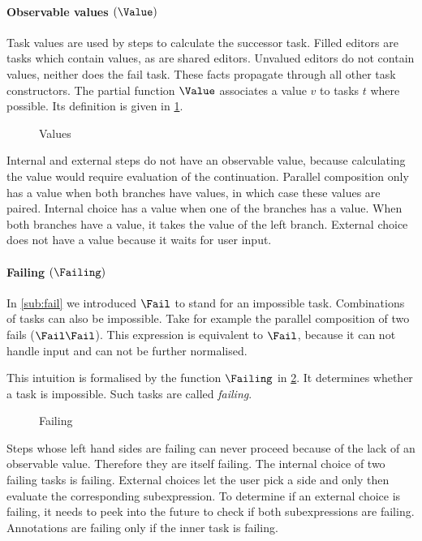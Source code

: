\paragraph{Observable values $(\Value)$}

Task values are used by steps to calculate the successor task.
Filled editors are tasks which contain values, as are shared editors.
Unvalued editors do not contain values, neither does the fail task.
These facts propagate through all other task constructors.
The partial function $\Value$ associates a value $v$ to tasks $t$ where possible.
Its definition is given in \cref{fig:observation-value}.

\begin{figure}[h]
  \small
  \caption{Values} \label{fig:observation-value}
\end{figure}

Internal and external steps do not have an observable value, because calculating the value would require evaluation of the continuation.
Parallel composition only has a value when both branches have values, in which case these values are paired.
Internal choice has a value when one of the branches has a value.
When both branches have a value, it takes the value of the left branch.
External choice does not have a value because it waits for user input.



\paragraph{Failing $(\Failing)$}

In \cref{sub:fail} we introduced $\Fail$ to stand for an impossible task.
Combinations of tasks can also be impossible.
Take for example the parallel composition of two fails ($\Fail \And \Fail$).
This expression is equivalent to $\Fail$, because it can not handle input and can not be further normalised.

This intuition is formalised by the function $\Failing$ in \cref{fig:observation-failing}.
It determines whether a task is impossible.
Such tasks are called \emph{failing}.

\begin{figure}[h]
  \small
  \caption{Failing} \label{fig:observation-failing}
\end{figure}

Steps whose left hand sides are failing can never proceed because of the lack of an observable value.
Therefore they are itself failing.
The internal choice of two failing tasks is failing.
External choices let the user pick a side and only then evaluate the corresponding subexpression.
To determine if an external choice is failing, it needs to peek into the future to check if both subexpressions are failing.
Annotations are failing only if the inner task is failing.



